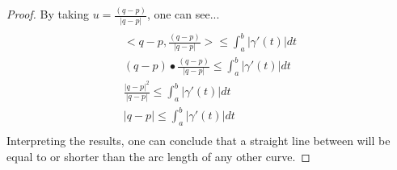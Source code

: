 \documentclass[12pt]{article}
\begin{document}
\begin{proof}
By taking $u=\frac{(q-p)}{|q-p|}$, one can see...
\begin{align}
\\ \nonumber
<q-p, \frac{(q-p)}{|q-p|}> \leq \int_{a}^{b} |\gamma'(t)| dt 
\\ \nonumber
(q-p) \bullet \frac{(q-p)}{|q-p|} \leq \int_{a}^{b} |\gamma'(t)| dt
\\ \nonumber
\frac{|q-p|^2}{|q-p|} \leq \int_{a}^{b} |\gamma'(t)| dt
\\ \nonumber
|q-p| \leq \int_{a}^{b} |\gamma'(t)| dt
\\ \nonumber
\end{align}
Interpreting the results, one can conclude that a straight line between  will be equal to or shorter than the arc length of any other curve.
\end{proof}
\end{document}
